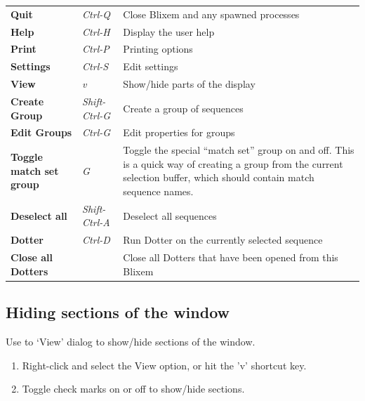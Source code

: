 \documentclass[letterpaper]{article}
\newcommand\liststyleWWviiiNumxxxi{%
\renewcommand\theenumi{\arabic{enumi}}
\renewcommand\theenumii{\alph{enumii}}
\renewcommand\theenumiii{\roman{enumiii}}
\renewcommand\theenumiv{\arabic{enumiv}}
\renewcommand\labelenumi{\theenumi.}
\renewcommand\labelenumii{\theenumii.}
\renewcommand\labelenumiii{\theenumiii.}
\renewcommand\labelenumiv{\theenumiv.}
}
\begin{document}
\begin{center}
\tablehead{}
\begin{supertabular}{p{2.9559999cm}p{2.187cm}p{8.343cm}}
\bfseries Quit &
\itshape Ctrl-Q &
 Close Blixem and any spawned processes\\
\bfseries Help &
\itshape Ctrl-H &
 Display the user help\\
 \textbf{Print}  &
\itshape Ctrl-P &
 Printing options\\
\bfseries Settings &
\itshape Ctrl-S &
 Edit settings\\
 \textbf{View}  &
\itshape v &
 Show/hide parts of the display\\
\bfseries Create Group &
\itshape Shift-Ctrl-G &
 Create a group of sequences\\
 \textbf{Edit Groups}  &
\itshape Ctrl-G &
 Edit properties for groups\\
\bfseries Toggle match set group &
\itshape G &
 Toggle the special {\textquotedblleft}match
set{\textquotedblright} group on and off. This is a quick way of
creating a group from the current selection buffer, which should
contain match sequence names.\\
\bfseries Deselect all &
\itshape Shift-Ctrl-A &
 Deselect all sequences\\
 \textbf{Dotter}  &
\itshape Ctrl-D &
 Run Dotter on the currently selected sequence\\
\bfseries Close all Dotters &
~
 &
 Close all Dotters that have been opened from
this Blixem\\
\end{supertabular}
\end{center}

{\color[rgb]{0.30980393,0.5058824,0.7411765}\subsection[Hiding sections of the window]{Hiding sections of the window}}
\hypertarget{RefHeading1801056909880}{}\label{bkm:RefHeading1801056909880}{
Use to {\textquoteleft}View{\textquoteright} dialog to show/hide
sections of the window.}

\liststyleWWviiiNumxxxi
\begin{enumerate}
\item {
Right-click and select the View option, or hit the
{\textquoteright}v{\textquoteright} shortcut key.}
\item {
Toggle check marks on or off to show/hide sections.}
\end{enumerate}
\end{document}
